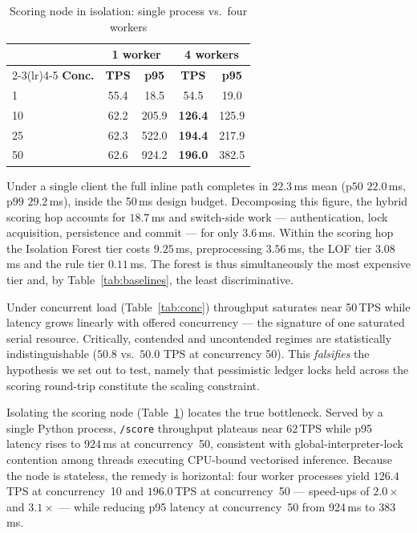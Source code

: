 \documentclass[journal]{IEEEtran}
\begin{document}
\begin{table}[t]
\caption{Scoring node in isolation: single process vs.\ four workers}
\label{tab:scale}
\centering
\begin{tabular}{lcccc}
\toprule
& \multicolumn{2}{c}{\textbf{1 worker}} &
  \multicolumn{2}{c}{\textbf{4 workers}} \\
\cmidrule(lr){2-3}\cmidrule(lr){4-5}
\textbf{Conc.} & \textbf{TPS} & \textbf{p95} & \textbf{TPS} &
\textbf{p95} \\
\midrule
1   & 55.4 & 18.5  & 54.5 & 19.0  \\
10  & 62.2 & 205.9 & \textbf{126.4} & 125.9 \\
25  & 62.3 & 522.0 & \textbf{194.4} & 217.9 \\
50  & 62.6 & 924.2 & \textbf{196.0} & 382.5 \\
\bottomrule
\end{tabular}
\end{table}

Under a single client the full inline path completes in $22.3$\,ms mean
($\mathrm{p}50$ $22.0$\,ms, $\mathrm{p}99$ $29.2$\,ms), inside the 50\,ms
design budget. Decomposing this figure, the hybrid scoring hop accounts for
$18.7$\,ms and switch-side work --- authentication, lock acquisition,
persistence and commit --- for only $3.6$\,ms. Within the scoring hop the
Isolation Forest tier costs $9.25$\,ms, preprocessing $3.56$\,ms, the LOF
tier $3.08$\,ms and the rule tier $0.11$\,ms. The forest is thus
simultaneously the most expensive tier and, by Table~\ref{tab:baselines},
the least discriminative.

Under concurrent load (Table~\ref{tab:conc}) throughput saturates near
50\,TPS while latency grows linearly with offered concurrency --- the
signature of one saturated serial resource. Critically, contended and
uncontended regimes are statistically indistinguishable ($50.8$ vs.\ $50.0$
TPS at concurrency 50). This \emph{falsifies} the hypothesis we set out to
test, namely that pessimistic ledger locks held across the scoring
round-trip constitute the scaling constraint.

Isolating the scoring node (Table~\ref{tab:scale}) locates the true
bottleneck. Served by a single Python process, \texttt{/score} throughput
plateaus near $62$\,TPS while p95 latency rises to $924$\,ms at
concurrency~50, consistent with global-interpreter-lock contention among
threads executing CPU-bound vectorised inference. Because the node is
stateless, the remedy is horizontal: four worker processes yield
$126.4$\,TPS at concurrency~10 and $196.0$\,TPS at concurrency~50 ---
speed-ups of $2.0\times$ and $3.1\times$ --- while reducing p95 latency at
concurrency~50 from 924\,ms to 383\,ms.
\end{document}
